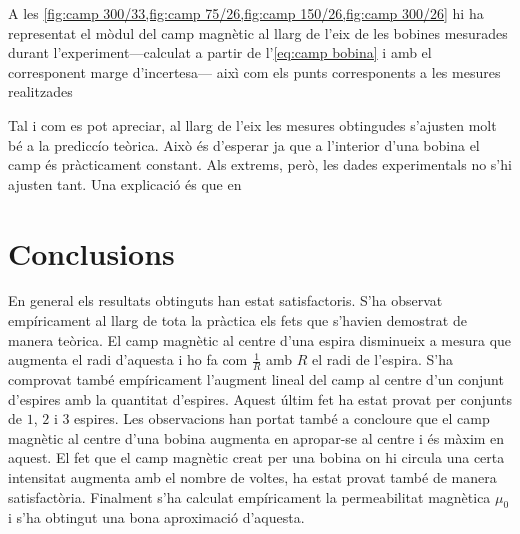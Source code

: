 A les \cref{fig:camp 300/33,fig:camp 75/26,fig:camp 150/26,fig:camp 300/26} hi ha representat el mòdul del camp magnètic al llarg de l'eix de les bobines mesurades durant l'experiment---calculat a partir de l'\cref{eq:camp bobina} i amb el corresponent marge d'incertesa--- aixì com els punts corresponents a les mesures realitzades

Tal i com es pot apreciar, al llarg de l'eix les mesures obtingudes s'ajusten molt bé a la prediccío teòrica. Això és d'esperar ja que a l'interior d'una bobina el camp és pràcticament constant. Als extrems, però, les dades experimentals no s'hi ajusten tant. Una explicació és que en  

\section{Conclusions}
En general els resultats obtinguts han estat satisfactoris. S'ha observat empíricament al llarg de tota la pràctica els fets que s'havien demostrat de manera teòrica. El camp magnètic al centre d'una espira disminueix a mesura que augmenta el radi d'aquesta i ho fa com $\frac{1}{R}$ amb $R$ el radi de l'espira. S'ha comprovat també empíricament l'augment lineal del camp al centre d'un conjunt d'espires amb la quantitat d'espires. Aquest últim fet ha estat provat per conjunts de $1$, $2$ i $3$ espires. Les observacions han portat també a concloure que el camp magnètic al centre d'una bobina augmenta en apropar-se al centre i és màxim en aquest. El fet que el camp magnètic creat per una bobina on hi circula una certa intensitat augmenta amb el nombre de voltes, ha estat provat també de manera satisfactòria. Finalment s'ha calculat empíricament la permeabilitat magnètica $\mu_{0}$ i s'ha obtingut una bona aproximació d'aquesta.




